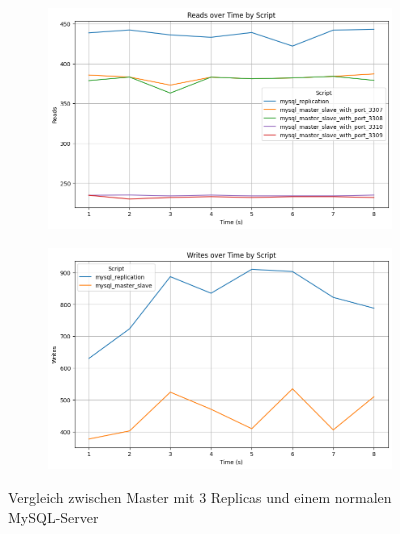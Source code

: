 \vspace{-8pt}
\begin{figure}[H]
  \centering
  \begin{subfigure}[t]{0.48\textwidth}
    \centering
    \includegraphics[width=\textwidth]{PNGs/Script/Replication/replication-vs-no/Reads}
  \end{subfigure}
  \hfill
  \begin{subfigure}[t]{0.48\textwidth}
    \centering
    \includegraphics[width=\textwidth]{PNGs/Script/Replication/replication-vs-no/Writes}
  \end{subfigure}
  \vspace{-8pt}
  \caption[Replikation: Master-Replica-Ansatz vs Single-Server]{Vergleich zwischen Master mit 3 Replicas und einem normalen MySQL-Server }
  \label{fig:replication-vs-no}
\end{figure}
\vspace{-20pt}

